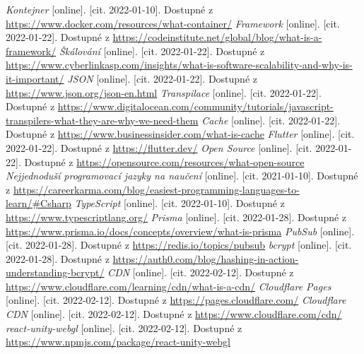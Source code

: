 \begin{thebibliography}{99}
     \textit{Kontejner} [online]. [cit. 2022-01-10]. Dostupné z \url{https://www.docker.com/resources/what-container/}
     \textit{Framework} [online]. [cit. 2022-01-22]. Dostupné z \url{https://codeinstitute.net/global/blog/what-is-a-framework/}
     \textit{Škálování} [online]. [cit. 2022-01-22]. Dostupné z \url{https://www.cyberlinkasp.com/insights/what-is-software-scalability-and-why-is-it-important/}
     \textit{JSON} [online]. [cit. 2022-01-22]. Dostupné z \url{https://www.json.org/json-en.html}
     \textit{Transpilace} [online]. [cit. 2022-01-22]. Dostupné z \url{https://www.digitalocean.com/community/tutorials/javascript-transpilers-what-they-are-why-we-need-them}
     \textit{Cache} [online]. [cit. 2022-01-22]. Dostupné z \url{https://www.businessinsider.com/what-is-cache}
     \textit{Flutter} [online]. [cit. 2022-01-22]. Dostupné z \url{https://flutter.dev/}
     \textit{Open Source} [online]. [cit. 2022-01-22]. Dostupné z \url{https://opensource.com/resources/what-open-source}
     \textit{Nejjednoduší programovací jazyky na naučení} [online]. [cit. 2021-01-10]. Dostupné z \url{https://careerkarma.com/blog/easiest-programming-languages-to-learn/#Csharp}
     \textit{TypeScript} [online]. [cit. 2022-01-10]. Dostupné z \url{https://www.typescriptlang.org/}
     \textit{Prisma} [online]. [cit. 2022-01-28]. Dostupné z \url{https://www.prisma.io/docs/concepts/overview/what-is-prisma}
     \textit{PubSub} [online]. [cit. 2022-01-28]. Dostupné z \url{https://redis.io/topics/pubsub}
     \textit{bcrypt} [online]. [cit. 2022-01-28]. Dostupné z \url{https://auth0.com/blog/hashing-in-action-understanding-bcrypt/}
     \textit{CDN} [online]. [cit. 2022-02-12]. Dostupné z \url{https://www.cloudflare.com/learning/cdn/what-is-a-cdn/}
     \textit{Cloudflare Pages} [online]. [cit. 2022-02-12]. Dostupné z \url{https://pages.cloudflare.com/}
     \textit{Cloudflare CDN} [online]. [cit. 2022-02-12]. Dostupné z \url{https://www.cloudflare.com/cdn/}
     \textit{react-unity-webgl} [online]. [cit. 2022-02-12]. Dostupné z \url{https://www.npmjs.com/package/react-unity-webgl}    
\end{thebibliography}


